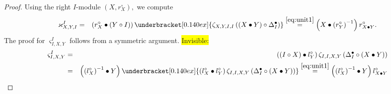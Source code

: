\documentclass[nosumlimits,twoside]{amsart}
\theoremstyle{definition}
\theoremstyle{remark}
\newenvironment{invisible}{{\noindent\sc \colorbox{yellow}{Invisible:}\;}\color{gray}}{\medskip}
\begin{document}
\begin{proof}
Using the right $I$-module $\left( X,r_{X}^{\circ }\right) ,$ we compute%
\begin{eqnarray*}
\varkappa _{X,Y,I}^{I} &=&\left( r_{X}^{\circ }\bullet \left( Y\circ
I\right) \right) \underbracket[0.140ex]{\zeta _{X,Y,I,I}\left( \left( X\bullet Y\right) \circ
\Delta _{I}^{\bullet }\right)}  %
\overset{\eqref{eq:unit1}}=\left(
X\bullet \left( r_{Y}^{\circ }\right) ^{-1}\right) r_{X\bullet Y}^{\circ }.
\end{eqnarray*}%
The proof for $\varsigma _{I,X,Y}^{I}$ follows from a symmetric argument.
\begin{invisible}
\begin{eqnarray*}
\varsigma _{I,X,Y}^{I} &=&\left( \left( I\circ X\right) \bullet l_{Y}^{\circ
}\right) \zeta _{I,I,X,Y}\left( \Delta _{I}^{\bullet }\circ \left( X\bullet
Y\right) \right)  \\
&=&\left( \left( l_{X}^{\circ }\right) ^{-1}\bullet Y\right) \underbracket[0.140ex]{%
\left( l_{X}^{\circ }\bullet l_{Y}^{\circ }\right) \zeta _{I,I,X,Y}\left(
\Delta _{I}^{\bullet }\circ \left( X\bullet Y\right) \right) }\overset{\eqref{eq:unit1}}{=}\left( \left(
l_{X}^{\circ }\right) ^{-1}\bullet Y\right) l_{X\bullet Y}^{\circ }
\end{eqnarray*}\end{invisible}
\end{proof}
\end{document}
